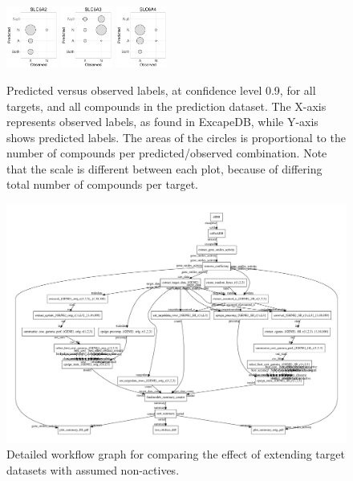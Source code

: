 \documentclass[utf8]{frontiers_suppmat} %
\begin{document}
\begin{figure}[h]
\includegraphics[width=0.15\textwidth]{figures/validation_plots/slc6a2_0p9_valplot.pdf}
\includegraphics[width=0.15\textwidth]{figures/validation_plots/slc6a3_0p9_valplot.pdf}
\vspace*{10pt} %
\includegraphics[width=0.15\textwidth]{figures/validation_plots/slc6a4_0p9_valplot.pdf}

    \caption{Predicted versus observed labels, at confidence level 0.9,
    for all targets, and all compounds in the prediction dataset.
    The X-axis represents observed labels, as found in ExcapeDB, while Y-axis
    shows predicted labels. The areas of the circles is proportional to the
    number of compounds per predicted/observed combination. Note that the scale
    is different between each plot, because of differing total number of
    compounds per target.}
    \label{fig:valplots_all_0.9}
\end{figure}

\begin{figure}[h]
\includegraphics[width=\textwidth]{figures/workflow_graph_fillup_vs_not.pdf}
    \caption{Detailed workflow graph for comparing the effect of extending
    target datasets with assumed non-actives.}
    \label{fig:workflow_detailed_fillup_vs_not}
\end{figure}
\end{document}
